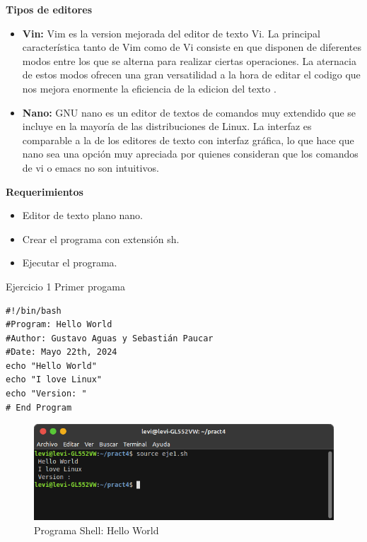 \documentclass[11pt,twoside]{book}
\begin{document}
\textbf{Tipos de editores}
\begin{itemize}
  \item\textbf{Vin: }Vim es la version mejorada del editor de texto Vi. La principal característica tanto de Vim como de Vi consiste en que disponen de diferentes modos entre los que se alterna para realizar ciertas operaciones.
La aternacia de estos modos ofrecen una gran versatilidad a la hora de editar el codigo que nos mejora enormente la eficiencia de la edicion del texto .
  \item\textbf{Nano: }GNU nano es un editor de textos de comandos muy extendido que se incluye en la mayoría de las distribuciones de Linux. La interfaz es comparable a la de los editores de texto con interfaz gráfica, lo que hace que nano sea una opción muy apreciada por quienes consideran que los comandos de vi o emacs no son intuitivos.

\end{itemize}
\vspace{10pt}

  \textbf{Requerimientos}
  \begin{itemize}
  \item Editor de texto plano nano.
  \item Crear el programa con extensión sh.
  \item Ejecutar el programa.
\end{itemize}

\vspace{10pt}

Ejercicio 1
Primer progama 

\begin{lstlisting}
#!/bin/bash
#Program: Hello World
#Author: Gustavo Aguas y Sebastián Paucar
#Date: Mayo 22th, 2024
echo "Hello World"
echo "I love Linux"
echo "Version: "
# End Program
\end{lstlisting}
 \begin{figure}[htb]
    \centering
     \includegraphics[width=0.8\linewidth]{introduccion/Lab4/eje1.png}
    \caption{Programa Shell: Hello World}
   \label{fig:etiqueta}
    \end{figure}
\vspace{10pt}
\end{document}
